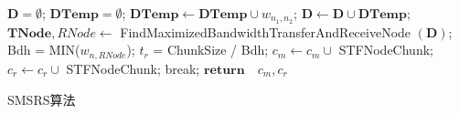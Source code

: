 \begin{algorithm}[htpb]
\begin{algorithmic}[1]
		\STATE $\textbf{D} = \emptyset $;
		\STATE $\textbf{DTemp} = \emptyset $;
		\STATE $\textbf{DTemp} \gets \textbf{DTemp} \cup w_{n_1,n_2}$;
		\ENDFOR
		\STATE $\textbf{D} \gets \textbf{D} \cup \textbf{DTemp} $;
		\ENDFOR
		\STATE $\textbf{TNode},RNode \gets$ FindMaximizedBandwidthTransferAndReceiveNode $(\textbf{D})$;
		\STATE Bdh = MIN($w_{n,RNode}$);
		\ENDFOR
		\STATE $t_r$ = ChunkSize / Bdh;
		\STATE $c_m \gets c_m \cup $ STFNodeChunk;
		\ELSE
		\STATE $c_r \gets c_r \cup $ STFNodeChunk;
		\ENDIF
		\STATE break;
		\ENDIF
		\ENDWHILE
		\STATE $\textbf{return} \quad c_m,c_r$
	\end{algorithmic}
	\caption{SMSRS算法}
	\label{alg:3-1}
\end{algorithm}


